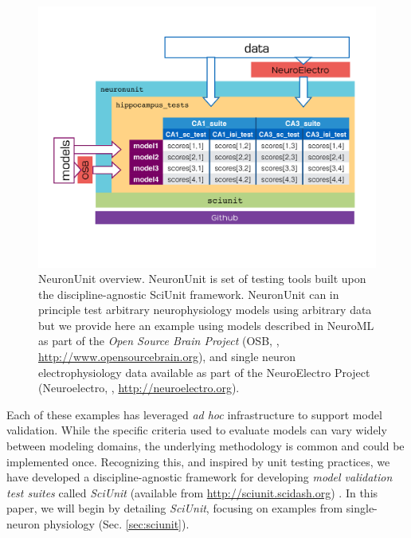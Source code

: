 \documentclass{frontiersSCNS}
\begin{document}
\begin{figure}
\vspace{-45px}
\centering
\includegraphics[scale=0.6]{diagram1.pdf}
\vspace{-65px}
\caption{NeuronUnit overview. NeuronUnit is set of testing tools built upon the discipline-agnostic SciUnit framework. 
NeuronUnit can in principle test arbitrary neurophysiology models using arbitrary data but we provide here an example using models described in NeuroML as part of the \textit{Open Source Brain Project} (OSB, \citep{gleeson_open_2012}, \url{http://www.opensourcebrain.org}), and single neuron electrophysiology data available as part of the NeuroElectro Project (Neuroelectro, \citep{tripathy_neuroelectro:_2012}, \url{http://neuroelectro.org}).}  
\label{fig:sciunit_overview}\vspace{-10px}
\end{figure}
\leavevmode


Each of these examples has leveraged \emph{ad hoc} infrastructure to support model validation. 
While the specific criteria used to evaluate models can vary widely between modeling domains, the underlying methodology is common and could be implemented once. 
Recognizing this, and inspired by unit testing practices, we have developed a discipline-agnostic framework for developing \emph{model validation test suites} called \textit{SciUnit} \citep{omar_sciunit_2013} (available from \url{http://sciunit.scidash.org}) . 
In this paper, we will begin by detailing \textit{SciUnit}, focusing on examples from single-neuron physiology (Sec. \ref{sec:sciunit}). 
\end{document}
